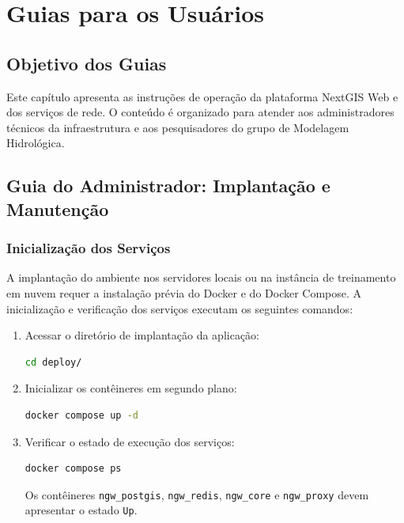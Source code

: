 
\chapter{Guias para os Usuários}
\label{cap:guias_usuarios}

\section{Objetivo dos Guias}

Este capítulo apresenta as instruções de operação da plataforma NextGIS Web e dos serviços de rede. O conteúdo é organizado para atender aos administradores técnicos da infraestrutura e aos pesquisadores do grupo de Modelagem Hidrológica.

\section{Guia do Administrador: Implantação e Manutenção}

\subsection{Inicialização dos Serviços}

A implantação do ambiente nos servidores locais ou na instância de treinamento em nuvem requer a instalação prévia do Docker e do Docker Compose. A inicialização e verificação dos serviços executam os seguintes comandos:

\begin{enumerate}
    \item Acessar o diretório de implantação da aplicação:
\begin{lstlisting}[language=bash]
cd deploy/
\end{lstlisting}
    \item Inicializar os contêineres em segundo plano:
\begin{lstlisting}[language=bash]
docker compose up -d
\end{lstlisting}
    \item Verificar o estado de execução dos serviços:
\begin{lstlisting}[language=bash]
docker compose ps
\end{lstlisting}
    Os contêineres \texttt{ngw\_postgis}, \texttt{ngw\_redis}, \texttt{ngw\_core} e \texttt{ngw\_proxy} devem apresentar o estado \texttt{Up}.
\end{enumerate}

